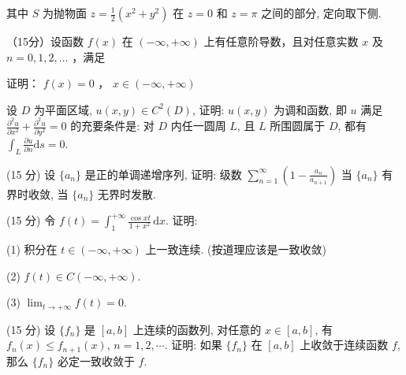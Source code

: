 其中 $S$ 为抛物面 $z = \frac{1}{2} (x^2 + y^2)$ 在 $z = 0$ 和 $z = \pi$ 之间的部分, 定向取下侧.\par
\par{}
\par{}
（15分）设函数 $f(x)$ 在 $(- \infty, + \infty)$ 上有任意阶导数，且对任意实数 $x$ 及 $n = 0,1,2,\dots$ ，满足\par
\nopagebreak[4]
证明： $f(x) = 0$ ， $x\in (-\infty , + \infty)$\par
\par{}
设 $D$ 为平面区域, $u(x, y) \in C^2(D)$, 证明: $u(x, y)$ 为调和函数, 即 $u$ 满足 $\frac{\partial^2 u}{\partial x^2} + \frac{\partial^2 u}{\partial y^2} = 0$ 的充要条件是: 对 $D$ 内任一圆周 $L$, 且 $L$ 所围圆属于 $D$, 都有 $\int_{L} \frac{\partial u}{\partial n} \mathrm{d}s = 0$.\par
\par{}
(15 分) 设 $\{a_{n}\}$ 是正的单调递增序列, 证明: 级数 $\sum_{n=1}^{\infty} \left(1 - \frac{a_{n}}{a_{n+1}}\right)$ 当 $\{a_{n}\}$ 有界时收敛, 当 $\{a_{n}\}$ 无界时发散.\par
\par{}
(15 分) 令 $f(t) = \int_{1}^{+\infty} \frac{\cos xt}{1 + x^2} \, \mathrm{d}x$. 证明:\par
(1) 积分在 $t \in (-\infty, +\infty)$ 上一致连续. (按道理应该是一致收敛)\par
(2) $f(t)\in C(-\infty , + \infty).$\par
(3)  $\lim_{t\to+\infty}f(t)=0.$\par
\par{}
(15 分) 设 $\{f_n\}$ 是 $[a, b]$ 上连续的函数列, 对任意的 $x \in [a, b]$, 有 $f_n(x) \leq f_{n+1}(x)$, $n = 1, 2, \cdots$. 证明: 如果 $\{f_n\}$ 在 $[a, b]$ 上收敛于连续函数 $f$, 那么 $\{f_n\}$ 必定一致收敛于 $f$.\par
